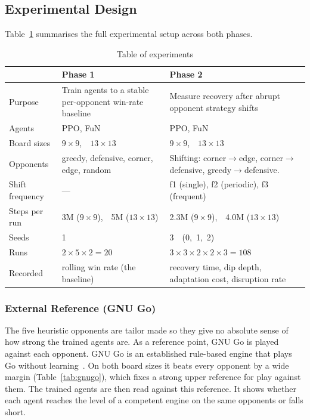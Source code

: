 \documentclass[sigconf,nonacm]{acmart}
\begin{document}
\subsection{Experimental Design}
Table~\ref{tab:experiments} summarises the full experimental setup across both
phases.


 \begin{table}[t]
  \centering
  \caption{Table of experiments}
  \label{tab:experiments}
  \footnotesize
  \renewcommand{\arraystretch}{0.3}
  \setlength{\tabcolsep}{4pt}
  \begin{tabular}{@{}p{2.1cm} p{6.4cm} p{7.1cm}@{}}
    \toprule
     & \textbf{Phase 1} & \textbf{Phase 2} \\
    \midrule
    Purpose
      & Train agents to a stable per-opponent win-rate baseline
      & Measure recovery after abrupt opponent strategy shifts \\
    \addlinespace[3pt]
    Agents      & PPO, FuN & PPO, FuN \\
    Board sizes & $9{\times}9$,\ \ $13{\times}13$ & $9{\times}9$,\ \ $13{\times}13$ \\
    Opponents
      & greedy, defensive, corner, edge, random
      & Shifting: corner$\to$edge, corner$\to$defensive, greedy$\to$defensive. \\
    Shift frequency & --- & f1 (single), f2 (periodic), f3 (frequent) \\
    Steps per run   & 3M ($9{\times}9$),\ \ 5M ($13{\times}13$) & 2.3M ($9{\times}9$),\ \ 4.0M ($13{\times}13$) \\
    Seeds           & 1 & 3\ \ (0,\ 1,\ 2) \\
    \addlinespace[1pt]
    Runs
      & $2 \times 5 \times 2 = 20$
      & $3 \times 3 \times 2 \times 2 \times 3 = 108$ \\
    Recorded
      & rolling win rate (the baseline)
      & recovery time, dip depth, adaptation cost, disruption rate \\
    \bottomrule
  \end{tabular}
\end{table}

\subsubsection{External Reference (GNU Go)}
The five heuristic opponents are tailor made so they give no absolute sense of how strong the trained agents are. As a reference point, GNU
Go is played against each opponent. GNU Go is an established rule-based engine that
plays Go without learning~\cite{gnugo}. On both board sizes it beats every
opponent by a wide margin (Table~\ref{tab:gnugo}), which fixes a strong upper reference for play against
them. The trained agents are then read against this reference. It shows whether
each agent reaches the level of a competent engine on the same opponents or falls
short.
\end{document}
